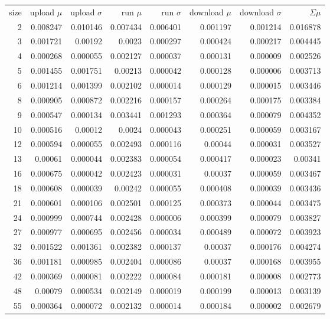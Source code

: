 \begin{longtable}{r r r r r r r r}
size & upload $\mu$  & upload $\sigma$ & run $\mu$ & run $\sigma$ & download $\mu$ & download $\sigma$ & $\Sigma \mu$ \\
2 & 0.008247 & 0.010146 & 0.007434 & 0.006401 & 0.001197 & 0.001214 & 0.016878 \\
3 & 0.001721 & 0.00192 & 0.0023 & 0.000297 & 0.000424 & 0.000217 & 0.004445 \\
4 & 0.000268 & 0.000055 & 0.002127 & 0.000037 & 0.000131 & 0.000009 & 0.002526 \\
5 & 0.001455 & 0.001751 & 0.00213 & 0.000042 & 0.000128 & 0.000006 & 0.003713 \\
6 & 0.001214 & 0.001399 & 0.002102 & 0.000014 & 0.000129 & 0.000015 & 0.003446 \\
8 & 0.000905 & 0.000872 & 0.002216 & 0.000157 & 0.000264 & 0.000175 & 0.003384 \\
9 & 0.000547 & 0.000134 & 0.003441 & 0.001293 & 0.000364 & 0.000079 & 0.004352 \\
10 & 0.000516 & 0.00012 & 0.0024 & 0.000043 & 0.000251 & 0.000059 & 0.003167 \\
12 & 0.000594 & 0.000055 & 0.002493 & 0.000116 & 0.00044 & 0.000031 & 0.003527 \\
13 & 0.00061 & 0.000044 & 0.002383 & 0.000054 & 0.000417 & 0.000023 & 0.00341 \\
16 & 0.000675 & 0.000042 & 0.002423 & 0.000031 & 0.00037 & 0.000059 & 0.003467 \\
18 & 0.000608 & 0.000039 & 0.00242 & 0.000055 & 0.000408 & 0.000039 & 0.003436 \\
21 & 0.000601 & 0.000106 & 0.002501 & 0.000125 & 0.000373 & 0.000044 & 0.003475 \\
24 & 0.000999 & 0.000744 & 0.002428 & 0.000006 & 0.000399 & 0.000079 & 0.003827 \\
27 & 0.000977 & 0.000695 & 0.002456 & 0.000034 & 0.000489 & 0.000072 & 0.003923 \\
32 & 0.001522 & 0.001361 & 0.002382 & 0.000137 & 0.00037 & 0.000176 & 0.004274 \\
36 & 0.001181 & 0.000985 & 0.002404 & 0.000086 & 0.00037 & 0.000168 & 0.003955 \\
42 & 0.000369 & 0.000081 & 0.002222 & 0.000084 & 0.000181 & 0.000008 & 0.002773 \\
48 & 0.00079 & 0.000534 & 0.002149 & 0.000019 & 0.000199 & 0.000013 & 0.003139 \\
55 & 0.000364 & 0.000072 & 0.002132 & 0.000014 & 0.000184 & 0.000002 & 0.002679 \\

\end{longtable}
